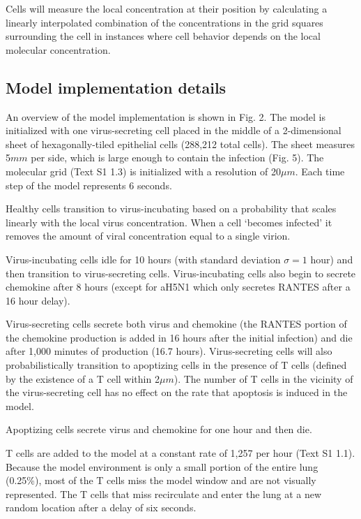 \documentclass[10pt]{article}
\begin{document}
Cells will measure the local concentration at their position by calculating a linearly interpolated combination of the concentrations in the grid squares surrounding the cell in instances where cell behavior depends on the local molecular concentration.


\subsection{Model implementation details}

An overview of the model implementation is shown in Fig. 2.  The model is initialized with one virus-secreting cell placed in the middle of a 2-dimensional sheet of hexagonally-tiled epithelial cells (288,212 total cells).  The sheet measures 5$mm$ per side, which is large enough to contain the infection (Fig. 5).  The molecular grid (Text S1 1.3) is initialized with a resolution of 20$\mu m$.  Each time step of the model represents 6 seconds.

Healthy cells transition to virus-incubating based on a probability that scales linearly with the local virus concentration.   When a cell `becomes infected' it removes the amount of viral concentration equal to a single virion. 

Virus-incubating cells idle for 10 hours (with standard deviation $\sigma=1$ hour) and then transition to virus-secreting cells.  Virus-incubating cells also begin to secrete chemokine after 8 hours (except for aH5N1 which only secretes RANTES after a 16 hour delay).  

Virus-secreting cells secrete both virus and chemokine (the RANTES portion of the chemokine production is added in 16 hours after the initial infection) and die after 1,000 minutes of production (16.7 hours).  Virus-secreting cells will also probabilistically transition to apoptizing cells in the presence of T cells (defined by the existence of a T cell within 2$\mu m$).  The number of T cells in the vicinity of the virus-secreting cell has no effect on the rate that apoptosis is induced in the model.

Apoptizing cells secrete virus and chemokine for one hour and then die.

T cells are added to the model at a constant rate of 1,257 per hour (Text S1 1.1).  Because the model environment is only a small portion of the entire lung (0.25\%), most of the T cells miss the model window and are not visually represented.  The T cells that miss recirculate and enter the lung at a new random location after a delay of six seconds.
\end{document}
